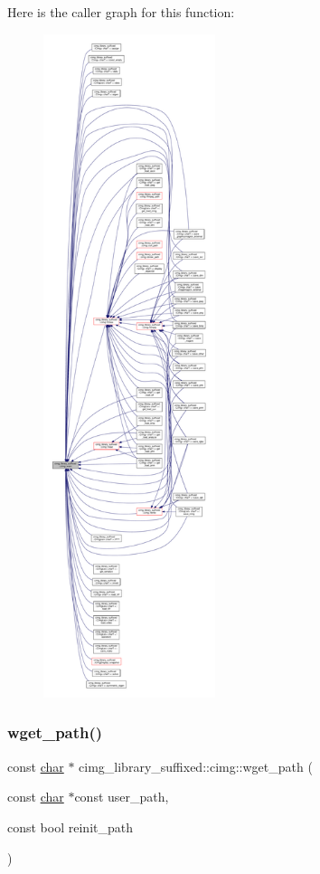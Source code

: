 Here is the caller graph for this function\+:
\nopagebreak
\begin{figure}[H]
\begin{center}
\leavevmode
\includegraphics[height=550pt]{d4/d9b/namespacecimg__library__suffixed_1_1cimg_acfd3624d72ed7f79c82ec45646c685e7_icgraph}
\end{center}
\end{figure}
\mbox{\label{namespacecimg__library__suffixed_1_1cimg_a36ccf2e6a6542f4e93eac819cf5d91ba}} 
\subsubsection{\texorpdfstring{wget\+\_\+path()}{wget\_path()}}
{\footnotesize\ttfamily const \hyperlink{classchar}{char} $\ast$ cimg\+\_\+library\+\_\+suffixed\+::cimg\+::wget\+\_\+path (\begin{DoxyParamCaption}\item[{const \hyperlink{classchar}{char} $\ast$const}]{user\+\_\+path,  }\item[{const bool}]{reinit\+\_\+path }\end{DoxyParamCaption})\hspace{0.3cm}{\ttfamily [inline]}}



